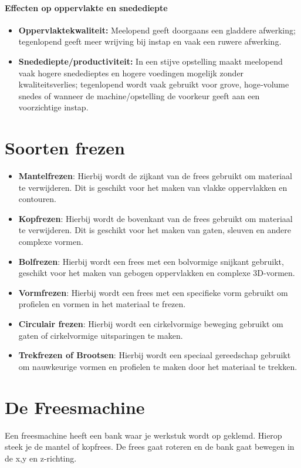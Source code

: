 \documentclass[a4paper,12pt,twoside]{report}
\begin{document}
\paragraph{Effecten op oppervlakte en snedediepte}
\begin{itemize}
	\item \textbf{Oppervlaktekwaliteit:} Meelopend geeft doorgaans een gladdere afwerking; tegenlopend geeft meer wrijving bij instap en vaak een ruwere afwerking.
	\item \textbf{Snedediepte/productiviteit:} In een stijve opstelling maakt meelopend vaak hogere snededieptes en hogere voedingen mogelijk zonder kwaliteitsverlies; tegenlopend wordt vaak gebruikt voor grove, hoge‑volume snedes of wanneer de machine/opstelling de voorkeur geeft aan een voorzichtige instap.
\end{itemize}

\section{Soorten frezen}
\begin{itemize}
	\item \textbf{Mantelfrezen}: Hierbij wordt de zijkant van de frees gebruikt om materiaal te verwijderen. Dit is geschikt voor het maken van vlakke oppervlakken en contouren.
	\item \textbf{Kopfrezen}: Hierbij wordt de bovenkant van de frees gebruikt om materiaal te verwijderen. Dit is geschikt voor het maken van gaten, sleuven en andere complexe vormen.
	\item \textbf{Bolfrezen}: Hierbij wordt een frees met een bolvormige snijkant gebruikt, geschikt voor het maken van gebogen oppervlakken en complexe 3D-vormen.
	\item \textbf{Vormfrezen}: Hierbij wordt een frees met een specifieke vorm gebruikt om profielen en vormen in het materiaal te frezen.
	\item \textbf{Circulair frezen}: Hierbij wordt een cirkelvormige beweging gebruikt om gaten of cirkelvormige uitsparingen te maken.
	\item \textbf{Trekfrezen of Brootsen}: Hierbij wordt een speciaal gereedschap gebruikt om nauwkeurige vormen en profielen te maken door het materiaal te trekken.
\end{itemize}

\section{De Freesmachine}
Een freesmachine heeft een bank waar je werkstuk wordt op geklemd. Hierop steek je de mantel of kopfrees.
De frees gaat roteren en de bank gaat bewegen in de x,y en z-richting.
\end{document}
